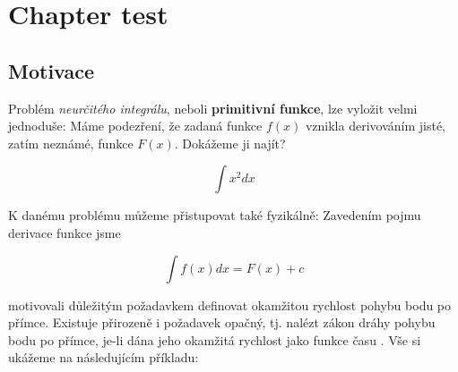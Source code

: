 \documentclass{scrbook}
\begin{document}
\chapter{Chapter test}
\section{Motivace}
  Problém \emph{neurčitého integrálu}, neboli \textbf{primitivní funkce}, lze vyložit velmi 
  jednoduše: Máme podezření, že zadaná funkce \(f(x)\) vznikla derivováním jisté, zatím neznámé, 
  funkce \(F(x)\). Dokážeme ji najít? 
  \begin{mdframed}[style=mdeq] 
    \begin{equation}
      \int x^2 dx
    \end{equation}
  \end{mdframed}
  K danému problému můžeme přistupovat také fyzikálně: Zavedením pojmu derivace funkce jsme 
  \begin{mdframed}[style=mdeq]
    \begin{equation}\label{mai:eq102}
      \boxed{\int f(x) dx = F(x) + c}
    \end{equation}
  \end{mdframed}
  motivovali důležitým požadavkem definovat okamžitou rychlost pohybu bodu po přímce. Existuje 
  přirozeně i požadavek opačný, tj. nalézt zákon dráhy pohybu bodu po přímce, je-li dána jeho 
  okamžitá rychlost jako funkce času \cite[s.~253]{Brabec1989}. Vše si ukážeme na následujícím 
  příkladu:     
\end{document}
